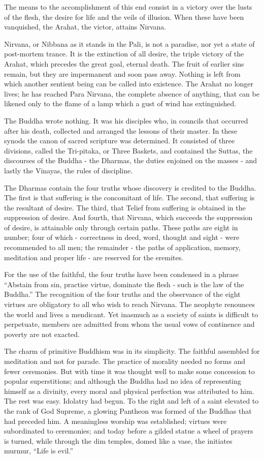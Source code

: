 \documentclass[]{book}
\begin{document}
The means to the accomplishment of this end consist in a victory over
the lusts of the flesh, the desire for life and the veils of illusion.
When these have been vanquished, the Arahat, the victor, attains
Nirvana.

Nirvana, or Nibbana as it stands in the Pali, is not a paradise, nor yet
a state of post-mortem trance. It is the extinction of all desire, the
triple victory of the Arahat, which precedes the great goal, eternal
death. The fruit of earlier sins remain, but they are impermanent and
soon pass away. Nothing is left from which another sentient being can be
called into existence. The Arahat no longer lives; he has reached Para
Nirvana, the complete absence of anything, that can be likened only to
the flame of a lamp which a gust of wind has extinguished.

The Buddha wrote nothing. It was his disciples who, in councils that
occurred after his death, collected and arranged the lessons of their
master. In these synods the canon of sacred scripture was determined. It
consisted of three divisions, called the Tri-pitaka, or Three Baskets,
and contained the Suttas, the discourses of the Buddha - the Dharmas,
the duties enjoined on the masses - and lastly the Vinayas, the rules of
discipline.

The Dharmas contain the four truths whose discovery is credited to the
Buddha. The first is that suffering is the concomitant of life. The
second, that suffering is the resultant of desire. The third, that
Telief from suffering is obtained in the suppression of desire. And
fourth, that Nirvana, which succeeds the suppression of desire, is
attainable only through certain paths. These paths are eight in number;
four of which - correctness in deed, word, thought and sight - were
recommended to all men; the remainder - the paths of application,
memory, meditation and proper life - are reserved for the eremites.

For the use of the faithful, the four truths have been condensed in a
phrase ``Abstain from sin, practise virtue, dominate the flesh - such is
the law of the Buddha.'' The recognition of the four truths and the
observance of the eight virtues are obligatory to all who wish to reach
Nirvana. The neophyte renounces the world and lives a mendicant. Yet
inasmuch as a society of saints is difficult to perpetuate, members are
admitted from whom the usual vows of continence and poverty are not
exacted.

The charm of primitive Buddhism was in its simplicity. The faithful
assembled for meditation and not for parade. The practice of morality
needed no forms and fewer ceremonies. But with time it was thought well
to make some concession to popular superstitions; and although the
Buddha had no idea of representing himself as a divinity, every moral
and physical perfection was attributed to him. The rest was easy.
Idolatry had begun. To the right and left of a saint elevated to the
rank of God Supreme, a glowing Pantheon was formed of the Buddhas that
had preceded him. A meaningless worship was established; virtues were
subordinated to ceremonies; and today before a gilded statue a wheel of
prayers is turned, while through the dim temples, domed like a vase, the
initiates murmur, ``Life is evil.''
\end{document}
